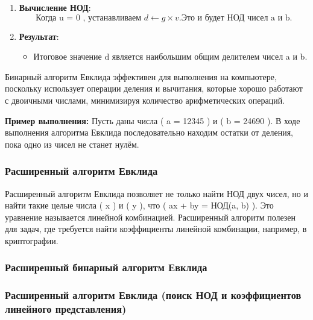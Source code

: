 \documentclass[
]{article}
\providecommand{\tightlist}{%
  \setlength{\itemsep}{0pt}\setlength{\parskip}{0pt}}
\begin{document}
\begin{enumerate}
\def\labelenumi{\arabic{enumi}.}
\tightlist
\item
  \textbf{Вычисление НОД}: \[
  \text{Когда  u = 0 , устанавливаем }  d \leftarrow g \times v . \text{Это и будет НОД чисел  a и b}.
  \]
\item
  \textbf{Результат}:

  \begin{itemize}
  \tightlist
  \item
    Итоговое значение d является наибольшим общим делителем чисел a и b.
  \end{itemize}
\end{enumerate}

Бинарный алгоритм Евклида эффективен для выполнения на компьютере,
поскольку использует операции деления и вычитания, которые хорошо
работают с двоичными числами, минимизируя количество арифметических
операций.

\textbf{Пример выполнения:} Пусть даны числа ( a = 12345 ) и ( b = 24690
). В ходе выполнения алгоритма Евклида последовательно находим остатки
от деления, пока одно из чисел не станет нулём.

\subsubsection{Расширенный алгоритм
Евклида}\label{ux440ux430ux441ux448ux438ux440ux435ux43dux43dux44bux439-ux430ux43bux433ux43eux440ux438ux442ux43c-ux435ux432ux43aux43bux438ux434ux430}

Расширенный алгоритм Евклида позволяет не только найти НОД двух чисел,
но и найти такие целые числа ( x ) и ( y ), что ( ax + by = НОД(a, b) ).
Это уравнение называется линейной комбинацией. Расширенный алгоритм
полезен для задач, где требуется найти коэффициенты линейной комбинации,
например, в криптографии.

\subsubsection{Расширенный бинарный алгоритм
Евклида}\label{ux440ux430ux441ux448ux438ux440ux435ux43dux43dux44bux439-ux431ux438ux43dux430ux440ux43dux44bux439-ux430ux43bux433ux43eux440ux438ux442ux43c-ux435ux432ux43aux43bux438ux434ux430}

\subsubsection{Расширенный алгоритм Евклида (поиск НОД и коэффициентов
линейного
представления)}\label{ux440ux430ux441ux448ux438ux440ux435ux43dux43dux44bux439-ux430ux43bux433ux43eux440ux438ux442ux43c-ux435ux432ux43aux43bux438ux434ux430-ux43fux43eux438ux441ux43a-ux43dux43eux434-ux438-ux43aux43eux44dux444ux444ux438ux446ux438ux435ux43dux442ux43eux432-ux43bux438ux43dux435ux439ux43dux43eux433ux43e-ux43fux440ux435ux434ux441ux442ux430ux432ux43bux435ux43dux438ux44f}
\end{document}
